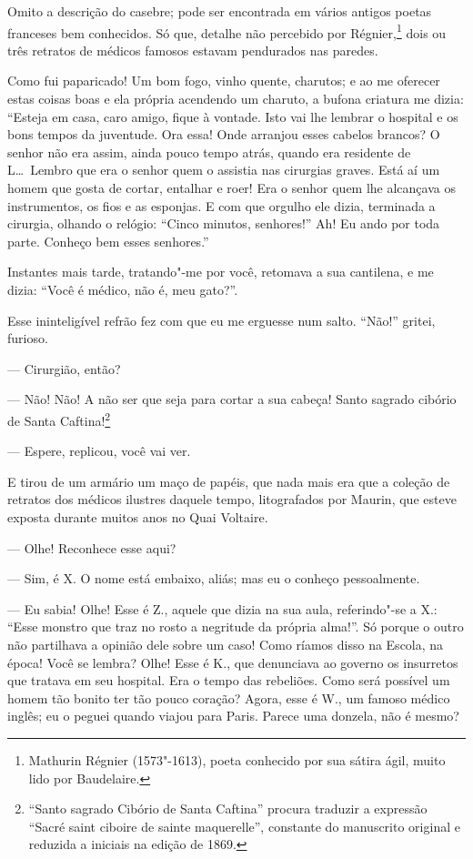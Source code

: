 Omito a descrição do casebre; pode ser encontrada em vários antigos
poetas franceses bem conhecidos. Só que, detalhe não percebido por
Régnier,\footnote{  Mathurin Régnier (1573"-1613), poeta conhecido por sua sátira ágil,
muito lido por Baudelaire.} dois ou três retratos de médicos famosos
estavam pendurados nas paredes.

Como fui paparicado! Um bom fogo, vinho quente, charutos; e ao me
oferecer estas coisas boas e ela própria acendendo um charuto, a bufona
criatura me dizia: “Esteja em casa, caro amigo, fique à
vontade. Isto vai lhe lembrar o hospital e os bons tempos da juventude. 
Ora essa! Onde arranjou esses
cabelos brancos? O senhor não era assim, ainda pouco tempo atrás,
quando era residente de L\ldots\  Lembro que era o senhor quem o assistia nas
cirurgias graves. Está aí um homem que gosta de cortar, entalhar e
roer! Era o senhor quem lhe alcançava os instrumentos, os fios e as
esponjas. E com que orgulho ele dizia, terminada a cirurgia,
olhando o relógio: “Cinco minutos,
senhores!'' Ah! Eu ando por toda parte. Conheço bem
esses senhores.''

Instantes mais tarde, tratando"-me por você, retomava a sua
cantilena, e me dizia: “Você é médico, não é, meu
gato?''.

Esse ininteligível refrão fez com que eu me erguesse num salto.
``Não!'' gritei, furioso.

--- Cirurgião, então?

--- Não! Não! A não ser que seja para cortar a sua cabeça! Santo
sagrado cibório de Santa Caftina!\footnote{   ``Santo sagrado Cibório de Santa Caftina''
procura traduzir a expressão ``Sacré saint ciboire de
sainte maquerelle'', constante do manuscrito original e
reduzida a iniciais na edição de 1869.}

--- Espere, replicou, você vai ver.

E tirou de um armário um maço de papéis, que nada mais era que a
coleção de retratos dos médicos ilustres daquele tempo, litografados
por Maurin, que esteve exposta durante muitos anos no Quai
Voltaire.

--- Olhe! Reconhece esse aqui?

--- Sim, é X. O nome está embaixo, aliás; mas eu o conheço
pessoalmente.

--- Eu sabia! Olhe! Esse é Z., aquele que dizia na sua aula,
referindo"-se a X.: “Esse monstro que traz no rosto a
negritude da própria alma!''. Só porque o outro não
partilhava a opinião dele sobre um caso! Como ríamos disso na
Escola, na época! Você se lembra? Olhe! Esse é K., que
denunciava ao governo os insurretos que tratava em seu hospital. Era o
tempo das rebeliões. Como será possível um homem tão bonito ter tão
pouco coração? Agora, esse é W., um famoso médico inglês; eu o
peguei quando viajou para Paris. Parece uma donzela, não é
mesmo?


